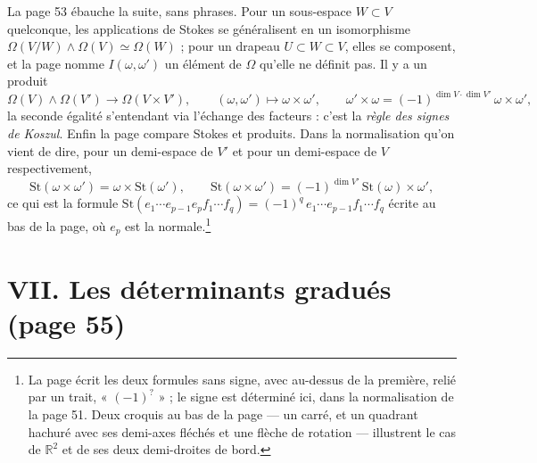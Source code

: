 \documentclass[11pt,a4paper]{article}
\begin{document}
La page 53 ébauche la suite, sans phrases. Pour un sous-espace $W \subset V$
quelconque, les applications de Stokes se généralisent en un isomorphisme
$\Omega(V/W) \wedge \Omega(V) \simeq \Omega(W)$ ; pour un drapeau
$U \subset W \subset V$, elles se composent, et la page nomme
$I(\omega, \omega')$ un élément de $\Omega$ qu'elle ne définit pas. Il y a un
produit
\[
\Omega(V) \wedge \Omega(V') \to \Omega(V \times V'),
\qquad
(\omega, \omega') \mapsto \omega \times \omega',
\qquad
\omega' \times \omega = (-1)^{\dim V \cdot \dim V'}\, \omega \times \omega' ,
\]
la seconde égalité s'entendant via l'échange des facteurs : c'est la
\emph{règle des signes de Koszul}. Enfin la page compare Stokes et produits.
Dans la normalisation qu'on vient de dire, pour un demi-espace de $V'$ et pour
un demi-espace de $V$ respectivement,
\[
\mathrm{St}(\omega \times \omega') = \omega \times \mathrm{St}(\omega'),
\qquad
\mathrm{St}(\omega \times \omega') = (-1)^{\dim V'}\, \mathrm{St}(\omega) \times \omega' ,
\]
ce qui est la formule
$\mathrm{St}(e_1 \cdots e_{p-1} e_p f_1 \cdots f_q) =
(-1)^q\, e_1 \cdots e_{p-1} f_1 \cdots f_q$ écrite au bas de la page, où
$e_p$ est la normale.\footnote{La page écrit les deux formules sans signe,
avec au-dessus de la première, relié par un trait, « $(-1)^?$ » ; le signe
est déterminé ici, dans la normalisation de la page 51. Deux croquis au bas de
la page --- un carré, et un quadrant hachuré avec ses demi-axes fléchés et
une flèche de rotation --- illustrent le cas de $\mathbb{R}^2$ et de ses
deux demi-droites de bord.}

\section*{VII. Les déterminants gradués (page 55)}
\end{document}
